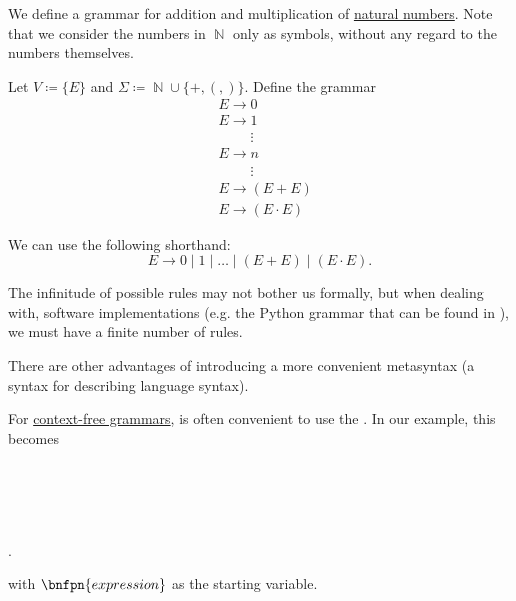 \begin{example}\label{ex:natural_number_arithmetic_grammar/backus_naur_form}
  We define a grammar for addition and multiplication of \hyperref[def:set_of_natural_numbers]{natural numbers}. Note that we consider the numbers in \( \BbbN \) only as symbols, without any regard to the numbers themselves.

  Let \( V \coloneqq \{ E \} \) and \( \Sigma \coloneqq \BbbN \cup \{ +, (, ) \} \). Define the grammar
  \begin{equation}\label{eq:ex:natural_number_arithmetic_grammar/backus_naur_form/simple}
    \begin{aligned}
      &E \to 0 \\
      &E \to 1 \\
      &\phantom{E \to} \vdots \\
      &E \to n \\
      &\phantom{E \to} \vdots \\
      &E \to (E + E) \\
      &E \to (E \cdot E)
    \end{aligned}
  \end{equation}

  We can use the following shorthand:
  \begin{equation}\label{eq:ex:natural_number_arithmetic_grammar/backus_naur_form/shorthand}
    E \to 0 \mid 1 \mid \ldots \mid (E + E) \mid (E \cdot E).
  \end{equation}

  The infinitude of possible rules may not bother us formally, but when dealing with, software implementations (e.g. the Python grammar that can be found in \cite{Python39Grammar}), we must have a finite number of rules.

  There are other advantages of introducing a more convenient metasyntax (a syntax for describing language syntax).

  For \hyperref[def:grammar/context_free]{context-free grammars}, is often convenient to use the . In our example, this becomes
  \begin{bnf*}
     { \bnfor {} \bnfor {} \bnfor {} \bnfor {} \bnfor {} \bnfor {} \bnfor {} \bnfor {}} \\
             { \bnfor {}} \\
            { \bnfor {} \bnfsp {}} \\
         {\bnfts{+} \bnfor \bnfts{\( \cdot \)}} \\
        { \bnfor \bnfts{(} \bnfsp {} \bnfsp {} \bnfsp {} \bnfsp \bnfts{)}}.
  \end{bnf*}
  with \( \bnfpn{expression} \) as the starting variable.


\end{example}
